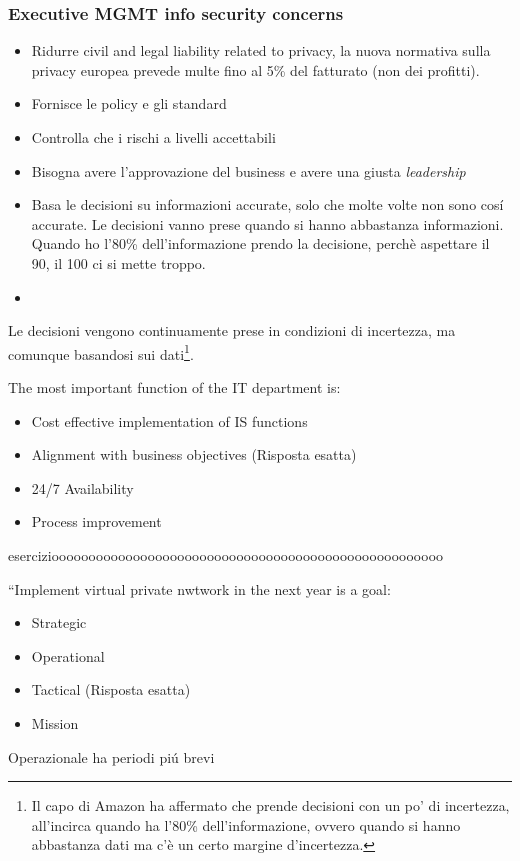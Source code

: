 \subsubsection{Executive MGMT info security concerns}

\begin{itemize}
\item Ridurre civil and legal liability related to privacy, la nuova normativa 
sulla privacy europea prevede multe fino al 5\% del fatturato (non dei 
profitti).
\item Fornisce le policy e gli standard
\item Controlla che i rischi a livelli accettabili
\item Bisogna avere l'approvazione del business e avere una giusta 
\textit{leadership}
\item Basa le decisioni su informazioni accurate, solo che molte volte non sono 
cosí accurate. Le decisioni vanno prese quando si hanno abbastanza informazioni. 
Quando ho l'80\% dell'informazione prendo la decisione, perchè aspettare il 90, 
il 100 ci si mette troppo.
\item {}
\end{itemize}


Le decisioni vengono continuamente prese in condizioni di incertezza, ma 
comunque basandosi sui dati\footnote{Il capo di Amazon ha affermato che prende 
decisioni con un po' di incertezza, all'incirca quando ha l'80\% 
dell'informazione, ovvero quando si hanno abbastanza dati ma c'è un certo 
margine d'incertezza.}.




The most important function of the IT department is:\begin{itemize}
\item Cost effective implementation of IS functions
\item Alignment with business objectives (Risposta esatta)
\item 24/7 Availability
\item Process improvement
\end{itemize}


eserciziooooooooooooooooooooooooooooooooooooooooooooooooooooo

``Implement virtual private nwtwork in the next year is a goal:
\begin{itemize}
\item Strategic
\item Operational 
\item Tactical (Risposta esatta)
\item Mission
\end{itemize}
Operazionale ha periodi piú brevi



